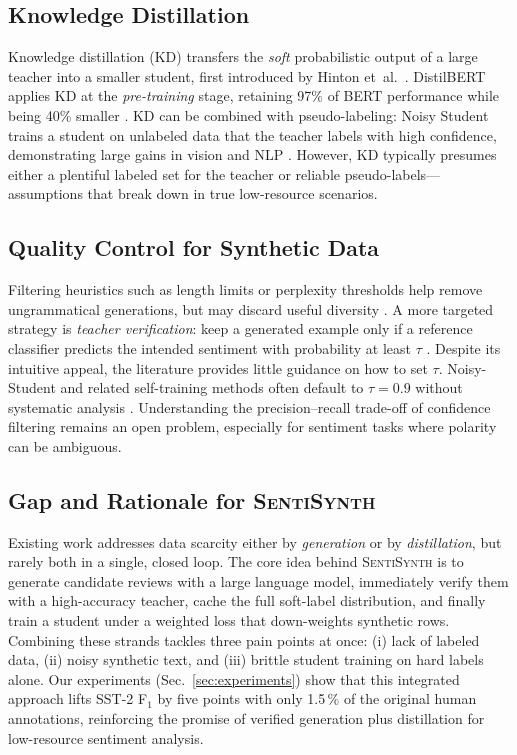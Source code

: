 \documentclass[11pt]{article}
\begin{document}
\subsection{Knowledge Distillation}
Knowledge distillation (KD) transfers the \emph{soft} probabilistic
output of a large teacher into a smaller student, first introduced by
Hinton et~al.\ \citep{hinton2015kd}. %
DistilBERT applies KD at the \emph{pre-training} stage, retaining
97\% of BERT performance while being 40\% smaller
\citep{sanh2019distilbert}. %
KD can be combined with pseudo-labeling: Noisy Student trains a student
on unlabeled data that the teacher labels with high confidence,
demonstrating large gains in vision and NLP
\citep{xie2020noisystudent}. %
However, KD typically presumes either a plentiful labeled set for the
teacher or reliable pseudo-labels—assumptions that break down in true
low-resource scenarios.

\subsection{Quality Control for Synthetic Data}
Filtering heuristics such as length limits or perplexity thresholds help
remove ungrammatical generations, but may discard useful diversity
\citep{sennrich2016backtrans}. %
A more targeted strategy is \emph{teacher verification}: keep a generated
example only if a reference classifier predicts the intended sentiment
with probability at least $\tau$ \citep{zhang2017textgan}. %
Despite its intuitive appeal, the literature provides little guidance on
how to set $\tau$.  Noisy-Student and related self-training methods often
default to $\tau\!=\!0.9$ without systematic analysis
\citep{xie2020noisystudent}. %
Understanding the precision–recall trade-off of confidence filtering
remains an open problem, especially for sentiment tasks where polarity
can be ambiguous.

\subsection{Gap and Rationale for \textsc{SentiSynth}}
Existing work addresses data scarcity either by \emph{generation} or by
\emph{distillation}, but rarely both in a single, closed loop.  The core
idea behind \textsc{SentiSynth} is to generate candidate reviews with a
large language model, immediately verify them with a high-accuracy
teacher, cache the full soft-label distribution, and finally train a
student under a weighted loss that down-weights synthetic rows.
Combining these strands tackles three pain points at once: (i) lack of
labeled data, (ii) noisy synthetic text, and (iii) brittle student
training on hard labels alone.  Our experiments (Sec.~\ref{sec:experiments})
show that this integrated approach lifts SST-2 F$_1$ by five points with
only 1.5\,\% of the original human annotations, reinforcing the promise
of verified generation plus distillation for low-resource sentiment
analysis.
\end{document}
